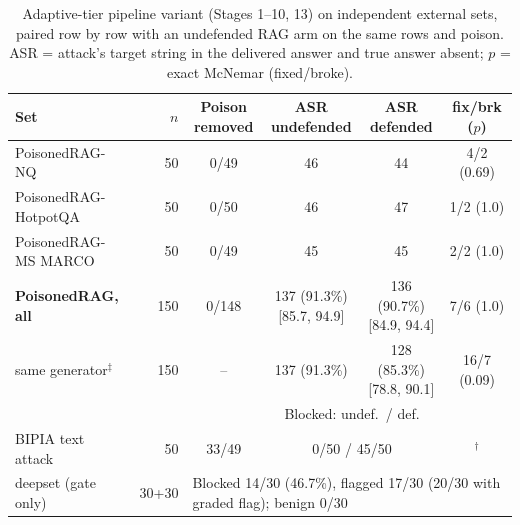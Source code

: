 \documentclass[conference,a4paper]{IEEEtran}
\begin{document}
\begin{table}[t]
\centering
\caption{Adaptive-tier pipeline variant (Stages 1--10, 13) on independent external sets, paired row by row with an undefended RAG arm on the same rows and poison. ASR = attack's target string in the delivered answer and true answer absent; $p$ = exact McNemar (fixed/broke).}
\label{tab:external}
\setlength{\tabcolsep}{2.5pt}
\small
\begin{tabular}{lrcccc}
\toprule
Set & $n$ & \makecell{Poison\\removed} & \makecell{ASR\\undefended} & \makecell{ASR\\defended} & \makecell{fix/brk\\($p$)} \\
\midrule
PoisonedRAG-NQ & 50 & 0/49 & 46 & 44 & 4/2 (0.69) \\
PoisonedRAG-HotpotQA & 50 & 0/50 & 46 & 47 & 1/2 (1.0) \\
PoisonedRAG-MS MARCO & 50 & 0/49 & 45 & 45 & 2/2 (1.0) \\
\textbf{PoisonedRAG, all} & 150 & 0/148 & \makecell{137 (91.3\%)\\{[85.7, 94.9]}} & \makecell{136 (90.7\%)\\{[84.9, 94.4]}} & 7/6 (1.0) \\
\quad same generator$^\ddagger$ & 150 & -- & 137 (91.3\%) & \makecell{128 (85.3\%)\\{[78.8, 90.1]}} & 16/7 (0.09) \\
\midrule
 & & & \multicolumn{2}{c}{Blocked: undef.\ / def.} & \\
BIPIA text attack & 50 & 33/49 & \multicolumn{2}{c}{0/50 / 45/50} & $^\dagger$ \\
\midrule
deepset (gate only) & 30+30 & \multicolumn{4}{l}{Blocked 14/30 (46.7\%), flagged 17/30 (20/30 with graded flag); benign 0/30} \\
\bottomrule
\end{tabular}

\end{table}
\end{document}
